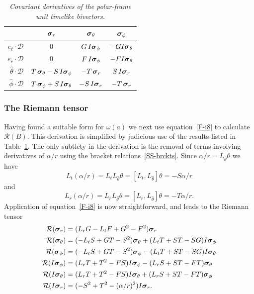 \documentclass[a4paper]{article}
\numberwithin{equation}{section}
\newcommand{\dt}{\! \cdot \!}
\newcommand{\alp}{\alpha}
\newcommand{\sig}{\mbox{\boldmath $\sigma$}}
\newcommand{\om}{\omega}
\newcommand{\bsig}{\mbox{\boldmath $\sig$}}
\newcommand{\cld}{{\mathcal{D}}}
\newcommand{\clr}{{\mathcal{R}}}
\newcommand{\sigr}{\bsig_r}
\newcommand{\sigth}{\bsig_\theta}
\newcommand{\sigph}{\bsig_\phi}
\newcommand{\phht}{{\hat{\phi}}}
\newcommand{\thht}{{\hat{\theta}}}
\begin{document}
\begin{table}
\begin{center}
\begin{tabular}{r|ccc}
     		&  $\sigr$ 	& $\sigth$ 	& $\sigph$    \\ 
\hline
$e_t \dt\cld$	&  $0$ 		&$G\,I\sigph$  	&$-G I\sigth $ \\
$e_r \dt\cld$	&  $0$ 		&$F\,I\sigph$   &$-F I\sigth $ \\
$\thht\dt\cld$  & $T\,\sigth-S\,I\sigph$ & $-T\,\sigr$ & $S\, I\sigr$ \\
$\phht\dt\cld$  & $T\,\sigph+S\,I\sigth$ & $-S\, I\sigr$ & $-T\,\sigr$ 
\end{tabular}
\end{center}
\caption{\em Covariant derivatives of the polar-frame unit timelike
bivectors.} 
\label{SS-t1}
\end{table} 


\subsubsection*{The Riemann tensor}

Having found a suitable form for $\om(a)$ we next use
equation~\eqref{F-i8} to calculate $\clr(B)$.  This derivation is
simplified by judicious use of the results listed in
Table~\ref{SS-t1}.  The only subtlety in the derivation is the removal
of terms involving derivatives of $\alp/r$ using the bracket
relations~\eqref{SS-brckts}.  Since $\alp/r=L_\thht \theta$ we have
%
\begin{equation}
L_t (\alp /r) = L_t L_\thht \theta = [L_t, L_\thht]
\theta = -S \alp /r
\label{SS-eq1}
\end{equation}
%
and
%
\begin{equation}
L_r (\alp /r) = L_r L_\thht \theta = [L_r, L_\thht]
\theta = -T \alp /r.
\label{SS-eq2}
\end{equation}
%
Application of equation~\eqref{F-i8} is now straightforward, and leads to
the Riemann tensor
%
\begin{equation}
\begin{aligned}
\clr(\sigr) &= (L_r G - L_t F +G^2 - F^2) \sigr \\
\clr(\sigth) &= (-L_t S +GT -S^2) \sigth + (L_t T +ST-SG) I\sigph \\
\clr(\sigph) &= (-L_t S +GT -S^2) \sigph - (L_t T +ST-SG) I\sigth \\
\clr(I\sigph) &= (L_r T +T^2-FS) I\sigph - (L_r S+ST-FT) \sigth \\
\clr(I\sigth) &= (L_r T +T^2-FS) I\sigth + (L_r S+ST-FT) \sigph \\
\clr(I \sigr) &= (-S^2 + T^2 -(\alp /r)^2) I \sigr.
\label{SS-riem1}
\end{aligned}
\end{equation}
%
\end{document}
